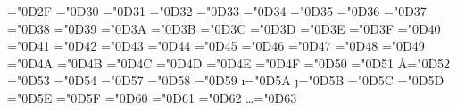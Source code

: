 \mathchardef\Omicron ="0D2F
\let\mOmicron=\Omicron 
\mathchardef\pi ="0D30
\let\mPi=\pi 
\mathchardef\varpi ="0D31
\let\mCurlyPi=\varpi 
\mathchardef\rho ="0D32
\let\mRho=\rho 
\mathchardef\varrho ="0D33
\let\mCurlyRho=\varrho 
\mathchardef\sigma ="0D34
\let\mSigma=\sigma 
\mathchardef\varsigma ="0D35
\let\mFinalSigma=\varsigma 
\mathchardef\tau ="0D36
\let\mTau=\tau 
\mathchardef\upsilon ="0D37
\let\mUpsilon=\upsilon 
\mathchardef\phi ="0D38
\let\mPhi=\phi 
\mathchardef\varphi ="0D39
\let\mCurlyPhi=\varphi 
\mathchardef\chi ="0D3A
\let\mChi=\chi 
\mathchardef\psi ="0D3B
\let\mPsi=\psi 
\mathchardef\omega ="0D3C
\let\mOmega=\omega 
\mathchardef\stigma ="0D3D
\let\mStigma=\stigma 
\mathchardef\digamma ="0D3E
\let\mDigamma=\digamma 
\mathchardef\koppa ="0D3F
\let\mKoppa=\koppa 
\mathchardef\sampi ="0D40
\let\mSampi=\sampi 
\mathchardef\infty ="0D41
\let\mInfinity=\infty 
\mathchardef\ExponentialE ="0D42
\let\mExponentialE=\ExponentialE 
\mathchardef\ImaginaryI ="0D43
\let\mImaginaryI=\ImaginaryI 
\mathchardef\ImaginaryJ ="0D44
\let\mImaginaryJ=\ImaginaryJ 
\mathchardef\DoubledGamma ="0D45
\let\mDoubledGamma=\DoubledGamma 
\mathchardef\DoubledPi ="0D46
\let\mDoubledPi=\DoubledPi 
\mathchardef\ConstantC ="0D47
\let\mConstantC=\ConstantC 
\mathchardef\ell ="0D48
\let\mScriptL=\ell 
\mathchardef\wp ="0D49
\let\mWeierstrassP=\wp 
\mathchardef\aleph ="0D4A
\let\mAleph=\aleph 
\mathchardef\beth ="0D4B
\let\mBet=\beth 
\mathchardef\gimel ="0D4C
\let\mGimel=\gimel 
\mathchardef\daleth ="0D4D
\let\mDalet=\daleth 
\mathchardef\Degree ="0D4E
\let\mDegree=\Degree 
\mathchardef\Micro ="0D4F
\let\mMicro=\Micro 
\mathchardef\hslash ="0D50
\let\mHBar=\hslash 
\mathchardef\mho ="0D51
\let\mMho=\mho 
\mathchardef\AA ="0D52
\let\mAngstrom=\AA 
\mathchardef\emptyset ="0D53
\let\mEmptySet=\emptyset 
\mathchardef\Hyphen ="0D54
\let\mHyphen=\Hyphen 
\def\mDash{\@unicode{Dash}}
\def\mLongDash{\@unicode{LongDash}}
\mathchardef\dagger ="0D57
\let\mDagger=\dagger 
\mathchardef\ddagger ="0D58
\let\mDoubleDagger=\ddagger 
\mathchardef\bullet ="0D59
\let\mBullet=\bullet 
\mathchardef\i ="0D5A
\let\mDotlessI=\i 
\mathchardef\j ="0D5B
\let\mDotlessJ=\j 
\mathchardef\imath ="0D5C
\let\mScriptDotlessI=\imath 
\mathchardef\jmath ="0D5D
\let\mScriptDotlessJ=\jmath 
\mathchardef\angle ="0D5E
\let\mAngle=\angle 
\mathchardef\RightAngle ="0D5F
\let\mRightAngle=\RightAngle 
\mathchardef\MeasuredAngle ="0D60
\let\mMeasuredAngle=\MeasuredAngle 
\mathchardef\SphericalAngle ="0D61
\let\mSphericalAngle=\SphericalAngle 
\mathchardef\Diameter ="0D62
\let\mDiameter=\Diameter 
\mathchardef\ldots ="0D63
\let\mEllipsis=\ldots 
